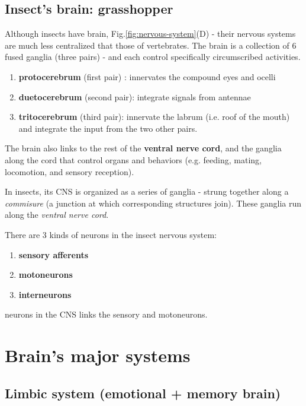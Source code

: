 \section{Insect's brain: grasshopper}
\label{sec:insect-brain}
\label{sec:grasshopper-brain}

Although insects have brain, Fig.\ref{fig:nervous-system}(D) - their nervous
systems are much less centralized that those of vertebrates. The brain is a
collection of 6 fused ganglia (three pairs) - and each control specifically
circumscribed activities.
\begin{enumerate}
  \item {\bf protocerebrum} (first pair) : innervates the compound eyes and
  ocelli
  
  \item {\bf duetocerebrum} (second pair): integrate signals from antennae
  
  \item {\bf tritocerebrum} (third pair): innervate the labrum (i.e. roof of the
  mouth) and integrate the input from the two other pairs.
\end{enumerate}
The brain also links to the rest of the {\bf ventral nerve cord}, and the
ganglia along the cord that control organs and behaviors (e.g. feeding, mating,
locomotion, and sensory reception).

In insects, its CNS is organized as a series of ganglia - strung together along
a {\it commisure} (a junction at which corresponding structures join).
These ganglia run along the {\it ventral nerve cord}.

There are 3 kinds of neurons in the insect nervous system: 
\begin{enumerate}
  \item {\bf sensory afferents}
  
  \item {\bf motoneurons}
  
  \item {\bf interneurons}
\end{enumerate}
neurons in the CNS links the sensory and motoneurons.



\chapter{Brain's major systems}

\section{Limbic system (emotional + memory brain)}

